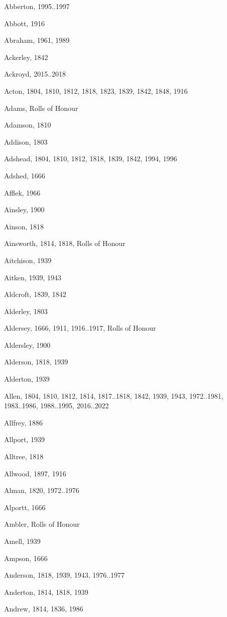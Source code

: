 \renewcommand*{\indexname}{Index of Surnames}
\begin{theindex}
\item Abberton, 1995..1997
\item Abbott, 1916
\item Abraham, 1961, 1989
\item Ackerley, 1842
\item Ackroyd, 2015..2018
\item Acton, 1804, 1810, 1812, 1818, 1823, 1839, 1842, 1848, 1916
\item Adams, Rolls of Honour
\item Adamson, 1810
\item Addison, 1803
\item Adshead, 1804, 1810, 1812, 1818, 1839, 1842, 1994, 1996
\item Adshed, 1666
\item Afflek, 1966
\item Ainsley, 1900
\item Ainson, 1818
\item Ainsworth, 1814, 1818, Rolls of Honour
\item Aitchison, 1939
\item Aitken, 1939, 1943
\item Aldcroft, 1839, 1842
\item Alderley, 1803
\item Aldersey, 1666, 1911, 1916..1917, Rolls of Honour
\item Aldersley, 1900
\item Alderson, 1818, 1939
\item Alderton, 1939
\item Allen, 1804, 1810, 1812, 1814, 1817..1818, 1842, 1939, 1943, 1972..1981, 1983..1986, 1988..1995, 2016..2022
\item Allfrey, 1886
\item Allport, 1939
\item Alltree, 1818
\item Allwood, 1897, 1916
\item Alman, 1820, 1972..1976
\item Alportt, 1666
\item Ambler, Rolls of Honour
\item Amell, 1939
\item Ampson, 1666
\item Anderson, 1818, 1939, 1943, 1976..1977
\item Anderton, 1814, 1818, 1939
\item Andrew, 1814, 1836, 1986

\end{theindex}

